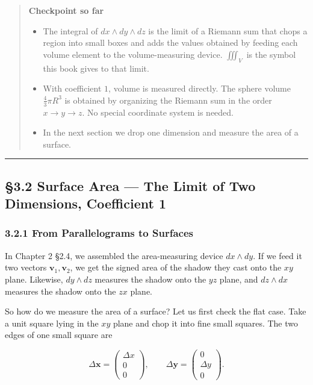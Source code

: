 \begin{quote}
\textbf{Checkpoint so far}

\begin{itemize}
\item
  The integral of \(dx \wedge dy \wedge dz\) is the limit of a Riemann
  sum that chops a region into small boxes and adds the values obtained
  by feeding each volume element to the volume-measuring device.
  \(\iiint_V\) is the symbol this book gives to that limit.
\item
  With coefficient \(1\), volume is measured directly. The sphere volume
  \(\frac{4}{3}\pi R^3\) is obtained by organizing the Riemann sum in
  the order \(x \to y \to z\). No special coordinate system is needed.
\item
  In the next section we drop one dimension and measure the area of a
  surface.
\end{itemize}
\end{quote}

\begin{center}\rule{0.5\linewidth}{0.5pt}\end{center}

\hypertarget{surface-area-the-limit-of-two-dimensions-coefficient-1}{%
\subsection{§3.2 Surface Area --- The Limit of Two Dimensions,
Coefficient
1}\label{surface-area-the-limit-of-two-dimensions-coefficient-1}}

\hypertarget{from-parallelograms-to-surfaces}{%
\subsubsection{3.2.1 From Parallelograms to
Surfaces}\label{from-parallelograms-to-surfaces}}

In Chapter 2 §2.4, we assembled the area-measuring device
\(dx \wedge dy\). If we feed it two vectors
\(\mathbf{v}_1, \mathbf{v}_2\), we get the signed area of the shadow
they cast onto the \(xy\) plane. Likewise, \(dy \wedge dz\) measures the
shadow onto the \(yz\) plane, and \(dz \wedge dx\) measures the shadow
onto the \(zx\) plane.

So how do we measure the area of a surface? Let us first check the flat
case. Take a unit square lying in the \(xy\) plane and chop it into fine
small squares. The two edges of one small square are

\[\Delta\mathbf{x}=\begin{pmatrix}\Delta x\\0\\0\end{pmatrix},\qquad
\Delta\mathbf{y}=\begin{pmatrix}0\\\Delta y\\0\end{pmatrix}.\]

